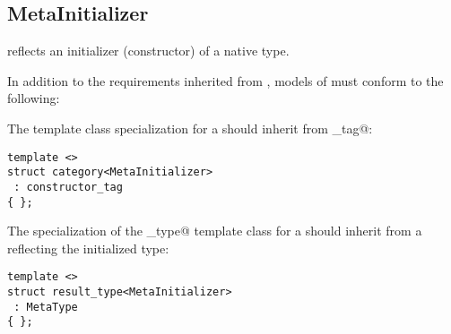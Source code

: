 \subsection{MetaInitializer}
\label{concept-MetaInitializer}

 reflects an initializer (constructor) of a native type.

In addition to the requirements inherited from ,
models of  must conform to the following:

The \verb@category@ template class specialization for a  should
inherit from \verb@constructor_tag@:

\begin{verbatim}
template <>
struct category<MetaInitializer>
 : constructor_tag
{ };
\end{verbatim}

The specialization of the \verb@result_type@ template class for a  should
inherit from a  reflecting the initialized type:

\begin{verbatim}
template <>
struct result_type<MetaInitializer>
 : MetaType
{ };
\end{verbatim}

